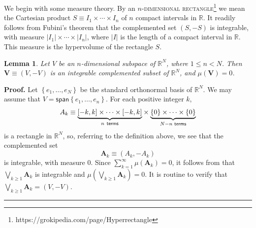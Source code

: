 \documentclass[11pt]{article}%
\newtheorem{lemma}[theorem]{Lemma}
\newenvironment{proof}[1][Proof]{\noindent\textbf{#1.} }{\ \rule{0.5em}{0.5em}}
\begin{document}
\medskip


We begin with some measure theory. By an $n$\textsc{-dimensional
rectangle}\footnote{%
\normalfont\sf
https://grokipedia.com/page/Hyperrectangle} we mean the Cartesian product
$S\equiv I_{1}\times\cdots\times I_{n}$ of $n$ compact intervals in
$\mathbb{R}$. It readily follows from Fubini's theorem \cite[Ch. 6, (9.7)]{BB}
that the complemented set $\left(  S,-S\right)  $ is integrable, with measure
$\left\vert I_{1}\right\vert \times\cdots\times\left\vert I_{n}\right\vert $,
where $\left\vert I\right\vert $ is the length of a compact interval in
$\mathbb{R}$. This measure is the hypervolume of the rectangle $S$.

\begin{lemma}
\label{jul03l1}Let $V$ be an $n$-dimensional subspace of $\mathbb{R}^{N}$,
where $1\leqslant n<N$. Then $\mathbf{V}\equiv\left(  V,-V\right)  $ is an
integrable complemented subset of $\mathbb{R}^{N}$, and $\mu(\mathbf{V})=0$.
\end{lemma}

\begin{proof}
Let $\left\{  e_{1},\ldots,e_{N}\right\}  $ be the standard orthonormal basis
of $\mathbb{R}^{N}$. We may assume that $V=\mathsf{span}\left\{  e_{1}%
,\ldots,e_{n}\right\}  $. For each positive integer $k$,%
\[
A_{k}\equiv\underset{n~\text{\textsf{terms}}}{\underbrace{\left[  -k,k\right]
\times\cdots\times\left[  -k,k\right]  }}\times\underset{N-n\text{
\textsf{terms}}}{\underbrace{\left\{  0\right\}  \times\cdots\times\{0\}}}%
\]
is a rectangle in $\mathbb{R}^{N}$, so, referring to the definition above, we
see that the complemented set%
\[
\mathbf{A}_{k}\equiv\left(  A_{k},-A_{k}\right)
\]
is integrable, with measure $0$. Since $\sum_{k=1}^{\infty}\mu(\mathbf{A}%
_{k})=0$, it follows from \cite[Ch. 6, (3.10)]{BB} that $%
{\displaystyle\bigvee\nolimits_{k\geqslant1}}
\mathbf{A}_{k}$ is integrable and $\mu\left(
{\displaystyle\bigvee\nolimits_{k\geqslant1}}
\mathbf{A}_{k}\right)  =0$. It is routine to verify that $%
{\displaystyle\bigvee\nolimits_{k\geqslant1}}
\mathbf{A}_{k}=(V,-V)$.
\end{proof}
\end{document}
